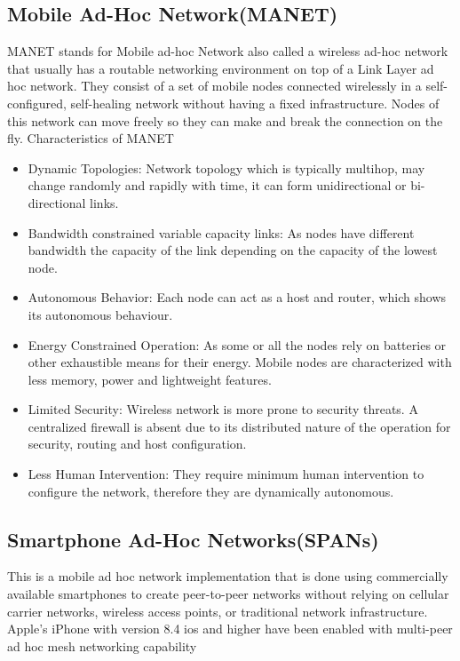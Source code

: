 \subsection{Mobile Ad-Hoc Network(MANET)}
\vspace{12pt}
MANET stands for Mobile ad-hoc Network also called a wireless ad-hoc network that usually has a routable networking environment on top of a Link Layer ad hoc network. They consist of a set of mobile nodes connected wirelessly in a self-configured, self-healing network without having a fixed infrastructure.  Nodes of this network can move freely so they can make and break the connection on the fly.\cite{TETRA}
\vspace{12pt}
Characteristics of MANET
\vspace{12pt}
\begin{itemize}
	\item  Dynamic Topologies: Network topology which is typically multihop, may change randomly and rapidly with time, it can form unidirectional or bi-directional links.
	\item   Bandwidth constrained variable capacity links: As nodes have different bandwidth the capacity of the link depending on the capacity of the lowest node.
	\item  Autonomous Behavior: Each node can act as a host and router, which shows its autonomous behaviour. 
	
	\item Energy Constrained Operation: As some or all the nodes rely on batteries or other exhaustible means for their energy. Mobile nodes are characterized with less memory, power and lightweight features.
	\item Limited Security: Wireless network is more prone to security threats. A centralized firewall is absent due to its distributed nature of the operation for security, routing and host configuration.
	\item Less Human Intervention: They require minimum human intervention to configure the network, therefore they are dynamically autonomous.


	 
	
\end{itemize}
\vspace{12pt}
\subsection{Smartphone Ad-Hoc Networks(SPANs)}
\vspace{12pt}
This is a mobile ad hoc network implementation that is done using commercially available smartphones to create peer-to-peer networks without relying on cellular carrier networks, wireless access points, or traditional network infrastructure. Apple's iPhone with version 8.4 ios and higher have been enabled with multi-peer ad hoc mesh networking capability\cite{apple}
\vspace{12pt}

